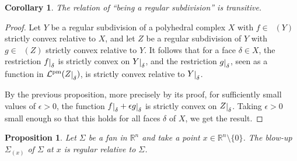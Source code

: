 \documentclass[11pt]{amsart}
\newtheorem{prop}[thm]{Proposition}
\newtheorem{cor}[thm]{Corollary}
\theoremstyle{definition}
\numberwithin{equation}{section}
\renewcommand{\~}{\widetilde}
\newcommand{\R}{\mathbb{R}}
\newcommand{\rest}[1]{\raisebox{-1pt}{$\vert$}_{#1}}
\DeclareMathOperator{\lpm}{\mathcal L^{pm}} %
\begin{document}
\begin{cor} \label{cor:transitivite_projectivite}
The relation of \enquote{being a regular subdivision} is transitive.
\end{cor}

\begin{proof}
Let $Y$ be a regular subdivision of a polyhedral complex $X$ with $f \in \lpm(Y)$ strictly convex relative to $X$, and let $Z$ be a regular subdivision of $Y$ with $g \in \lpm(Z)$ strictly convex relative to $Y$.
It follows that for a face $\delta \in X$, the restriction $f\rest{\delta}$ is strictly convex on $Y\rest{\delta}$, and the restriction $g\rest{\delta}$, seen as a function in $\lpm (Z\rest\delta)$, is strictly convex relative to $Y \rest \delta$.

By the previous proposition, more precisely by its proof, for sufficiently small values of $\epsilon>0$, the function $f\rest{\delta}+\epsilon g\rest{\delta}$ is strictly convex on $Z\rest{\delta}$. Taking $\epsilon>0$ small enough so that this holds for all faces $\delta$ of $X$, we get the result.
\end{proof}

\begin{prop} \label{prop:eclate_projectif}
Let $\Sigma$ be a fan in $\R^n$ and take a point $x\in \R^n\setminus\{0\}$. The blow-up $\Sigma_{(x)}$ of $\Sigma$ at $x$ is regular relative to $\Sigma$.
\end{prop}
\end{document}
